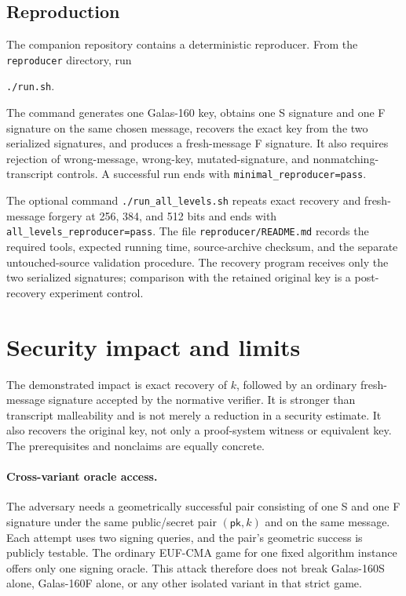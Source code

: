 \documentclass[11pt,a4paper]{article}
\newcommand{\pk}{\mathsf{pk}}
\begin{document}
\subsection{Reproduction}

The companion repository contains a deterministic reproducer.  From the
\texttt{reproducer} directory, run
\begin{center}
\texttt{./run.sh}.
\end{center}
The command generates one Galas-160 key, obtains one S signature and one F
signature on the same chosen message, recovers the exact key from the two
serialized signatures, and produces a fresh-message F signature.  It also
requires rejection of wrong-message, wrong-key, mutated-signature, and
nonmatching-transcript controls.  A successful run ends with
\texttt{minimal\_reproducer=pass}.

The optional command \texttt{./run\_all\_levels.sh} repeats exact recovery and
fresh-message forgery at 256, 384, and 512 bits and ends with
\texttt{all\_levels\_reproducer=pass}.  The file
\texttt{reproducer/README.md} records the required tools, expected running time,
source-archive checksum, and the separate untouched-source validation procedure.
The recovery program receives only the two serialized signatures; comparison
with the retained original key is a post-recovery experiment control.

\section{Security impact and limits}

The demonstrated impact is exact recovery of $k$, followed by an ordinary
fresh-message signature accepted by the normative verifier.  It is stronger than
transcript malleability and is not merely a reduction in a security estimate.
It also recovers the original key, not only a proof-system witness or equivalent
key.  The prerequisites and nonclaims are equally concrete.

\paragraph{Cross-variant oracle access.}
The adversary needs a geometrically successful pair consisting of one S and one F
signature under the same public/secret pair $(\pk,k)$ and on the same message.
Each attempt uses two signing queries, and the pair's geometric success is
publicly testable.  The ordinary EUF-CMA game for one fixed algorithm instance
offers only one signing oracle.  This attack therefore does not break Galas-160S
alone, Galas-160F alone, or any other isolated variant in that strict game.
\end{document}
